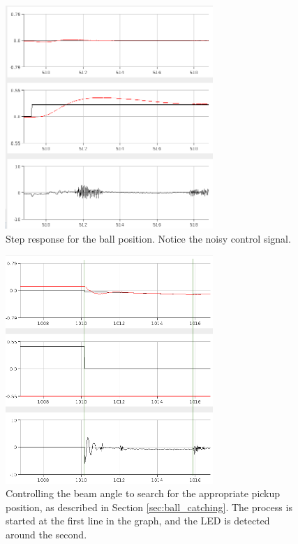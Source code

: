 \begin{figure}[h]
\centering
\includegraphics[width=0.7\textwidth]{figures/stepresponseball1-crop.png}
\caption{Step response for the ball position. Notice the noisy control signal.}
\label{fig:stepresponseball}
\end{figure}

\begin{figure}[h]
\centering
\includegraphics[width=0.7\textwidth]{figures/topickupposition-crop.png}
\caption{Controlling the beam angle to search for the appropriate pickup position, as described in Section \ref{sec:ball_catching}. The process is started at the first line in the graph, and the LED is detected around the second.}
\label{fig:topickupposition}
\end{figure}

